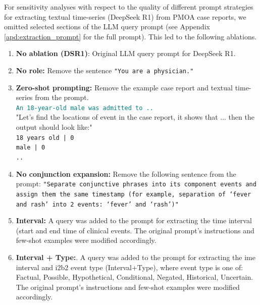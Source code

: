 For sensitivity analyses with respect to the quality of different prompt strategies for extracting textual time-series (DeepSeek R1) from PMOA case reports, we omitted selected sections of the LLM query prompt (see Appendix \ref{apd:extraction_prompt} for the full prompt). This led to the following ablations. 

\begin{enumerate}[leftmargin=*,topsep=0pt,itemsep=0pt]
    \item \textbf{No ablation (DSR1)}: Original LLM query prompt for DeepSeek R1.
    
    \item \textbf{No role:} Remove the sentence \texttt{"You are a physician."}
    
    \item \textbf{Zero-shot prompting:} Remove the example case report and textual time-series from the prompt. \\
    \textcolor{teal}{\texttt{An 18-year-old male was admitted to ..}}\\
    "Let's find the locations of event in the case report, it shows that ... then the output should look like:"\\
    \texttt{18 years old | 0 \\
    male | 0 \\
    ..}

    \item \textbf{No conjunction expansion:} Remove the following sentence from the prompt: \texttt{"Separate conjunctive phrases into its component events and assign them the same timestamp (for example, separation of ‘fever and rash’ into 2 events: ‘fever’ and ‘rash’)"}
    
    \item \textbf{Interval:} A query was added to the prompt for extracting the time interval (start and end time of clinical events. The original prompt’s instructions and few-shot examples were modified accordingly. 
    
    \item \textbf{Interval + Type:}. A query was added to the prompt for extracting the ime interval and i2b2
    event type (Interval+Type), where event type is one of: Factual, Possible, Hypothetical, Conditional, Negated, Historical, Uncertain. The original prompt’s instructions and few-shot examples were modified accordingly. 
\end{enumerate}

